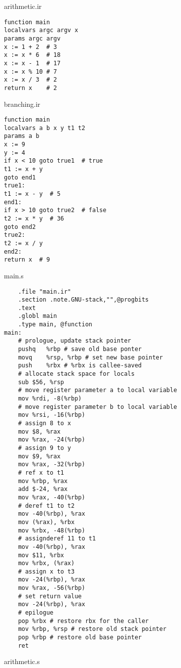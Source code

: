 \documentclass{article}
\begin{document}
arithmetic.ir

\begin{verbatim}
function main
localvars argc argv x
params argc argv
x := 1 + 2  # 3
x := x * 6  # 18
x := x - 1  # 17
x := x % 10 # 7
x := x / 3  # 2
return x    # 2
\end{verbatim}

branching.ir

\begin{verbatim}
function main
localvars a b x y t1 t2
params a b
x := 9
y := 4
if x < 10 goto true1  # true
t1 := x + y
goto end1
true1:
t1 := x - y  # 5
end1:
if x > 10 goto true2  # false
t2 := x * y  # 36
goto end2
true2:
t2 := x / y
end2:
return x  # 9
\end{verbatim}

\pagebreak

main.s

\begin{verbatim}
    .file "main.ir"
    .section .note.GNU-stack,"",@progbits
    .text
    .globl main
    .type main, @function
main:
    # prologue, update stack pointer
    pushq	%rbp # save old base ponter
    movq	%rsp, %rbp # set new base pointer
    push	%rbx # %rbx is callee-saved
    # allocate stack space for locals
    sub	$56, %rsp
    # move register parameter a to local variable
    mov	%rdi, -8(%rbp)
    # move register parameter b to local variable
    mov	%rsi, -16(%rbp)
    # assign 8 to x
    mov	$8, %rax
    mov	%rax, -24(%rbp)
    # assign 9 to y
    mov	$9, %rax
    mov	%rax, -32(%rbp)
    # ref x to t1
    mov	%rbp, %rax
    add	$-24, %rax
    mov	%rax, -40(%rbp)
    # deref t1 to t2
    mov	-40(%rbp), %rax
    mov	(%rax), %rbx
    mov	%rbx, -48(%rbp)
    # assignderef 11 to t1
    mov	-40(%rbp), %rax
    mov	$11, %rbx
    mov	%rbx, (%rax)
    # assign x to t3
    mov	-24(%rbp), %rax
    mov	%rax, -56(%rbp)
    # set return value
    mov	-24(%rbp), %rax
    # epilogue
    pop	%rbx # restore rbx for the caller
    mov	%rbp, %rsp # restore old stack pointer
    pop	%rbp # restore old base pointer
    ret
\end{verbatim}

\pagebreak

arithmetic.s
\end{document}
